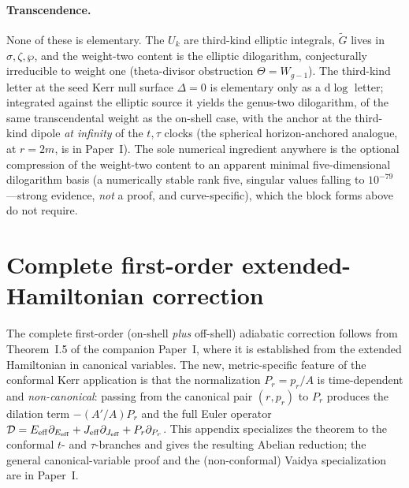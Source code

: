 \documentclass[12pt]{iopart}
\theoremstyle{plain}
\theoremstyle{definition}
\theoremstyle{remark}
\newcommand{\dd}{\mathrm{d}}
\begin{document}
\paragraph{Transcendence.}
None of these is elementary. The $U_k$ are third-kind elliptic integrals, $\tilde G$
lives in $\sigma,\zeta,\wp$, and the weight-two content is the elliptic dilogarithm,
conjecturally irreducible to weight one (theta-divisor obstruction $\Theta=W_{g-1}$). The
third-kind letter at the seed Kerr null surface $\Delta=0$ is elementary only as a
$\dd\log$ letter; integrated against the elliptic source it yields the genus-two
dilogarithm, of the same transcendental weight as the on-shell case, with the anchor at
the third-kind dipole \emph{at infinity} of the $t,\tau$ clocks (the spherical
horizon-anchored analogue, at $r=2m$, is in Paper~I). The sole
numerical ingredient anywhere is the optional compression of the weight-two content to
an apparent minimal five-dimensional dilogarithm basis (a numerically stable rank five,
singular values falling to $10^{-79}$---strong evidence, \emph{not} a proof, and
curve-specific), which the block forms above do not require.

\clearpage
\section{Complete first-order extended-Hamiltonian correction}
\label{app:firstorder}
The complete first-order (on-shell \emph{plus} off-shell) adiabatic correction follows
from Theorem~I.5 of the companion Paper~I, where it is established from the extended
Hamiltonian in canonical variables. The new, metric-specific feature of the conformal
Kerr application is that the normalization $P_r=p_r/A$ is time-dependent and
\emph{non-canonical}: passing from the canonical pair $(r,p_r)$ to $P_r$ produces the
dilation term $-(A'/A)P_r$ and the full Euler operator
$\mathcal D=E_{\rm eff}\partial_{E_{\rm eff}}+J_{\rm eff}\partial_{J_{\rm eff}}+P_r
\partial_{P_r}$. This appendix specializes the theorem to the conformal $t$- and
$\tau$-branches and gives the resulting Abelian reduction; the general canonical-variable
proof and the (non-conformal) Vaidya specialization are in Paper~I.
\end{document}
